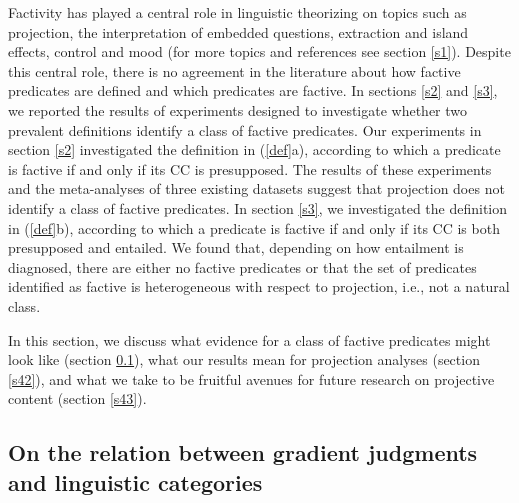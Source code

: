 \documentclass[11pt,fleqn]{article}
\newcommand{\6}{\mbox{$[\hspace*{-.6mm}[$}}
\newcommand{\9}{\mbox{$]\hspace*{-.6mm}]$}}
\begin{document}
Factivity has played a central role in linguistic theorizing on topics such as projection, the interpretation of embedded questions, extraction and island effects, control and mood (for more topics and references see section \ref{s1}). Despite this central role, there is no agreement in the literature about how factive predicates are defined and which predicates are factive. In sections \ref{s2} and \ref{s3}, we reported the results of experiments designed to investigate whether two prevalent definitions identify a class of factive predicates. Our experiments in section \ref{s2} investigated the definition in (\ref{def}a), according to which a predicate is factive if and only if its CC is presupposed. The results of these experiments and the meta-analyses of three existing datasets suggest that projection does not identify a class of factive predicates. In section \ref{s3}, we investigated the definition in (\ref{def}b), according to which a predicate is factive if and only if its CC is both presupposed and entailed. We found that, depending on how entailment is diagnosed, there are either no factive predicates or that the set of predicates identified as factive is heterogeneous with respect to projection, i.e., not a natural class. 

In this section, we discuss what evidence for a class of factive predicates might look like (section \ref{s41}), what our results mean for projection analyses (section \ref{s42}), and what we take to be fruitful avenues for future research on projective content (section \ref{s43}).

\subsection{On the relation between gradient judgments and linguistic categories}\label{s41}
\end{document}
